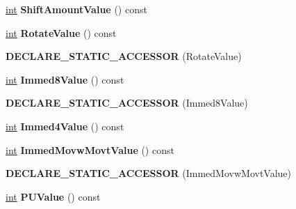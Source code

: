 \begin{DoxyCompactItemize}
\mbox{\hyperlink{classint}{int}} {\bfseries Shift\+Amount\+Value} () const
\item 
\mbox{\label{classv8_1_1internal_1_1Instruction_aa77045998e9f98b6a8d79a47887dcb93}} 
\mbox{\hyperlink{classint}{int}} {\bfseries Rotate\+Value} () const
\item 
\mbox{\label{classv8_1_1internal_1_1Instruction_a7683d308d637af223cb2acc3acf45dda}} 
{\bfseries D\+E\+C\+L\+A\+R\+E\+\_\+\+S\+T\+A\+T\+I\+C\+\_\+\+A\+C\+C\+E\+S\+S\+OR} (Rotate\+Value)
\item 
\mbox{\label{classv8_1_1internal_1_1Instruction_a19f7be473639842f8dcf105c7ba037d4}} 
\mbox{\hyperlink{classint}{int}} {\bfseries Immed8\+Value} () const
\item 
\mbox{\label{classv8_1_1internal_1_1Instruction_afe9f36bca70dd4ae6906107ba64dfa26}} 
{\bfseries D\+E\+C\+L\+A\+R\+E\+\_\+\+S\+T\+A\+T\+I\+C\+\_\+\+A\+C\+C\+E\+S\+S\+OR} (Immed8\+Value)
\item 
\mbox{\label{classv8_1_1internal_1_1Instruction_aacb931c01d6785e9d38e9e616726e9d9}} 
\mbox{\hyperlink{classint}{int}} {\bfseries Immed4\+Value} () const
\item 
\mbox{\label{classv8_1_1internal_1_1Instruction_a418c13e3193859de972645faafa65913}} 
\mbox{\hyperlink{classint}{int}} {\bfseries Immed\+Movw\+Movt\+Value} () const
\item 
\mbox{\label{classv8_1_1internal_1_1Instruction_a0de5172615eadb21942127510fce9fd4}} 
{\bfseries D\+E\+C\+L\+A\+R\+E\+\_\+\+S\+T\+A\+T\+I\+C\+\_\+\+A\+C\+C\+E\+S\+S\+OR} (Immed\+Movw\+Movt\+Value)
\item 
\mbox{\label{classv8_1_1internal_1_1Instruction_a624f7bd3487b1eea101ec638feacf1bf}} 
\mbox{\hyperlink{classint}{int}} {\bfseries P\+U\+Value} () const
\item 
\mbox{\label{classv8_1_1internal_1_1Instruction_a728a2fdbe7bbf9e5f3b3df7d9e7d476e}} 

\end{DoxyCompactItemize}
